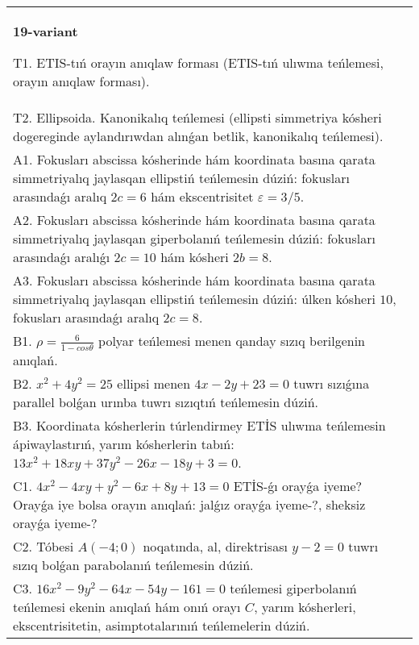 \documentclass{article}
\begin{document}
\begin{tabular}{m{17cm}}
\textbf{19-variant}
\newline

T1. ETIS-tıń orayın anıqlaw forması (ETIS-tıń ulıwma teńlemesi, orayın anıqlaw forması).\\

T2. Ellipsoida. Kanonikalıq teńlemesi (ellipsti simmetriya kósheri dogereginde aylandırıwdan alınǵan betlik, kanonikalıq teńlemesi).\\

A1. Fokusları abscissa kósherinde hám koordinata basına qarata simmetriyalıq jaylasqan ellipstiń teńlemesin dúziń: fokusları arasındaǵı aralıq $2 c=6$ hám ekscentrisitet $\varepsilon=3/5$.\\

A2. Fokusları abscissa kósherinde hám koordinata basına qarata simmetriyalıq jaylasqan giperbolanıń teńlemesin dúziń: fokusları arasındaǵı aralıǵı $2 c=10$ hám kósheri $2 b=8$.\\

A3. Fokusları abscissa kósherinde hám koordinata basına qarata simmetriyalıq jaylasqan ellipstiń teńlemesin dúziń: úlken kósheri $10$, fokusları arasındaǵı aralıq $2 c=8$.\\

B1. $\rho = \frac{6}{1 - cos\theta}$ polyar teńlemesi menen qanday sızıq berilgenin anıqlań.  \\

B2. $x^{2} + 4y^{2} = 25$ ellipsi menen $4x - 2y + 23 = 0$ tuwrı sızıǵına parallel bolǵan urınba tuwrı sızıqtıń teńlemesin dúziń.  \\

B3. Koordinata kósherlerin túrlendirmey ETİS ulıwma teńlemesin ápiwaylastırıń, yarım kósherlerin tabıń: $13x^{2} + 18xy + 37y^{2} - 26x - 18y + 3 = 0$.  \\

C1. $4x^{2} - 4xy + y^{2} - 6x + 8y + 13 = 0$ ETİS-ǵı orayǵa iyeme? Orayǵa iye bolsa orayın anıqlań: jalǵız orayǵa iyeme-?, sheksiz orayǵa iyeme-?  \\

C2. Tóbesi $A(-4;0)$ noqatında, al, direktrisası $y - 2 = 0$ tuwrı sızıq bolǵan parabolanıń teńlemesin dúziń.\\

C3. $16x^{2} - 9y^{2} - 64x - 54y - 161 = 0$ teńlemesi giperbolanıń teńlemesi ekenin anıqlań hám onıń orayı $C$, yarım kósherleri, ekscentrisitetin, asimptotalarınıń teńlemelerin dúziń.  \\

\end{tabular}
\vspace{1cm}
\end{document}
